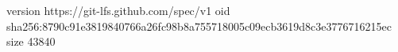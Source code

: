 version https://git-lfs.github.com/spec/v1
oid sha256:8790c91e3819840766a26fc98b8a755718005c09ecb3619d8c3e3776716215ec
size 43840
